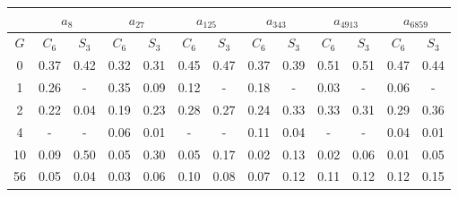 \begin{table}[h]
   \begin{center}
        \begin{tabular}{c|c|c|c|c|c|c|c|c|c|c|c|c}
            \toprule
            & \multicolumn{2}{c|}{$a_{8}$} & \multicolumn{2}{c|}{$a_{27}$} & \multicolumn{2}{c|}{$a_{125}$} & \multicolumn{2}{c|}{$a_{343}$} & \multicolumn{2}{c|}{$a_{4913}$} & \multicolumn{2}{c}{$a_{6859}$} \\
            \midrule
            $G$ & $C_{6}$ & $S_{3}$ & $C_{6}$ & $S_{3}$ & $C_{6}$ & $S_{3}$ & $C_{6}$ & $S_{3}$ & $C_{6}$ & $S_{3}$ & $C_{6}$ & $S_{3}$ \\
            \midrule
            0 & 0.37 & 0.42 & 0.32 & 0.31 & 0.45 & 0.47 & 0.37 & 0.39 & 0.51 & 0.51 & 0.47 & 0.44 \\
            1 & 0.26 & - & 0.35 & 0.09 & 0.12 & - & 0.18 & - & 0.03 & - & 0.06 & - \\
            2 & 0.22 & 0.04 & 0.19 & 0.23 & 0.28 & 0.27 & 0.24 & 0.33 & 0.33 & 0.31 & 0.29 & 0.36 \\
            4 & - & - & 0.06 & 0.01 & - & - & 0.11 & 0.04 & - & - & 0.04 & 0.01 \\
            10 & 0.09 & 0.50 & 0.05 & 0.30 & 0.05 & 0.17 & 0.02 & 0.13 & 0.02 & 0.06 & 0.01 & 0.05 \\
            56 & 0.05 & 0.04 & 0.03 & 0.06 & 0.10 & 0.08 & 0.07 & 0.12 & 0.11 & 0.12 & 0.12 & 0.15 \\
            \bottomrule
        \end{tabular}
   \end{center}
\end{table}
